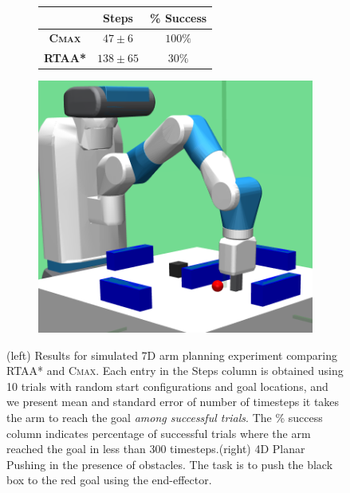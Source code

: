 \begin{figure}[t]
  \centering
  {
  \begin{subfigure}{0.1\linewidth}
    \begin{tabular}{|c|c|c|}
      \hline
      & \textbf{Steps} & \textbf{\% Success} \\
      \hline
      \textbf{\textsc{Cmax}} & $47 \pm 6$&$ 100\%$ \\
      \hline
      \textbf{RTAA*} & $138 \pm 65 $&$ 30\%$ \\
      \hline
    \end{tabular}
  \end{subfigure}}
  \hspace{60mm}
  \begin{subfigure}{0.3\linewidth}
    \includegraphics[width=\linewidth]{figures/cmax/fetch.png}
  \end{subfigure}
  \caption{(left) Results for simulated 7D arm planning experiment
    comparing RTAA* and \textsc{Cmax}. Each entry in the Steps column is obtained using 10
    trials with
    random start configurations and goal locations, and we present
    mean and standard error of number of timesteps it takes the arm to
    reach the goal \textit{among successful trials}. The \% success column
    indicates percentage of successful trials where the arm reached the
    goal in less than $300$ timesteps.(right)
    4D Planar Pushing in the presence of obstacles. The task
    is to push the black box to the red goal using the end-effector.}
  \label{fig:search}
  
\end{figure}

